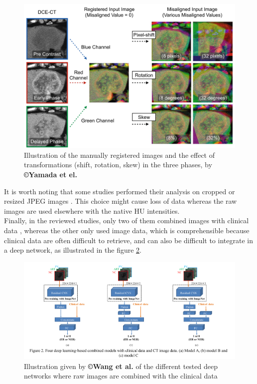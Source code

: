 \begin{figure}[th!]
\centering
\includegraphics[width=0.7\linewidth]{images/image12}
\caption{Illustration of the manually registered images and the effect of transformations (shift, rotation, skew) in the three phases, by \textbf{©Yamada et el. \cite{Yamada2019}}}
\label{Yamada2019_Fig1}
\end{figure}


It is worth noting that some studies performed their analysis on cropped or
resized JPEG images \cite{Yasaka2018,Yasaka2018a,WANG2019}. 
This choice might cause loss of data whereas the raw images are used elsewhere with the native HU intensities.\\
Finally, in the reviewed studies, only two of them combined images with
clinical data \cite{Yasaka2018a,WANG2019}, whereas the other only used image data, which is
comprehensible because clinical data are often difficult to retrieve,
and can also be difficult to integrate in a deep network, as illustrated
in the figure \ref{Wang2019_Fig2}.
\begin{figure}[th!]
\centering
\includegraphics[width=1.0\linewidth]{images/image5}
\caption{Illustration given by \textbf{©Wang et al.} of the different tested deep networks where raw images are combined with the clinical data \cite{WANG2019}}
\label{Wang2019_Fig2}
\end{figure}


